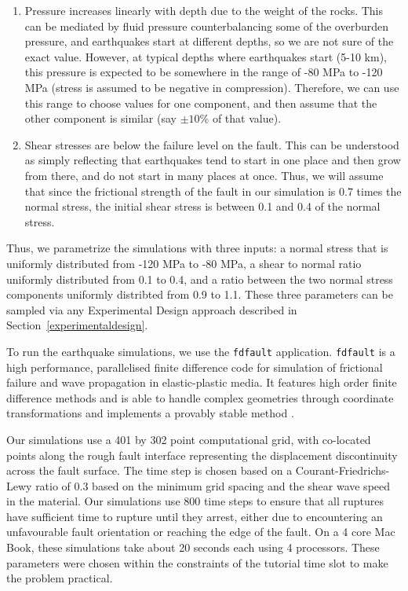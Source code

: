 \documentclass[openacc]{rstransa}%
\begin{document}
\begin{enumerate}
\item Pressure increases linearly with depth due to the weight of the rocks. This can be mediated by fluid pressure counterbalancing some of the overburden pressure, and earthquakes start at different depths, so we are not sure of the exact value. However, at typical depths where earthquakes start (5-10 km), this pressure is expected to be somewhere in the range of -80 MPa to -120 MPa (stress is assumed to be negative in compression). Therefore, we can use this range to choose values for one component, and then assume that the other component is similar (say $\pm 10\%$ of that value).
\item Shear stresses are below the failure level on the fault. This can be understood as simply reflecting that earthquakes tend to start in one place and then grow from there, and do not start in many places at once. Thus, we will assume that since the frictional strength of the fault in our simulation is 0.7 times the normal stress, the initial shear stress is between 0.1 and 0.4 of the normal stress.
\end{enumerate}

Thus, we parametrize the simulations with three inputs: a normal stress that is uniformly distributed from -120 MPa to -80 MPa, a shear to normal ratio uniformly distributed from 0.1 to 0.4, and a ratio between the two normal stress components uniformly distribted from 0.9 to 1.1. These three parameters can be sampled via
any Experimental Design approach described in Section~\ref{experimentaldesign}.

To run the earthquake simulations, we use the \texttt{fdfault} application. \texttt{fdfault} is a
high performance, parallelised
finite difference code for simulation of frictional failure and wave propagation in elastic-plastic media. It
features high order finite difference methods and is able to handle complex geometries through coordinate
transformations and implements a provably stable method \cite{kozdon}.

Our simulations use a 401 by 302 point computational grid, with co-located points along the rough fault
interface representing the displacement discontinuity across the fault surface.
The time step is chosen based on a Courant-Friedrichs-Lewy ratio of 0.3 based on the minimum grid spacing and
the shear wave speed in the material. Our simulations
use 800 time steps to ensure that all ruptures have sufficient time to rupture until they arrest, either
due to encountering an unfavourable fault orientation or reaching the edge of the fault. On a 4 core
Mac Book, these simulations take about 20 seconds each using 4 processors.
These parameters were chosen within the constraints
of the tutorial time slot to make the problem practical.
\end{document}
